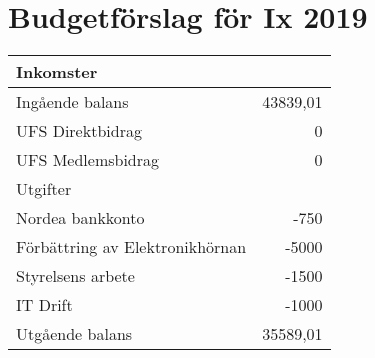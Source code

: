 \documentclass[a4paper,11pt,oneside]{article}
\begin{document}
\section*{Budgetförslag för Ix 2019}

\begin{tabular}{lr}
  \toprule
  Inkomster & \\
  \midrule
  Ingående balans & 43839,01 \\
  UFS Direktbidrag & 0 \\
  UFS Medlemsbidrag & 0 \\
  \midrule
  Utgifter & \\
  \midrule
  Nordea bankkonto & -750 \\
  Förbättring av Elektronikhörnan & -5000 \\
  Styrelsens arbete & -1500 \\
  IT Drift & -1000 \\
  \midrule
  Utgående balans & 35589,01 \\
  \bottomrule
\end{tabular}
\end{document}
